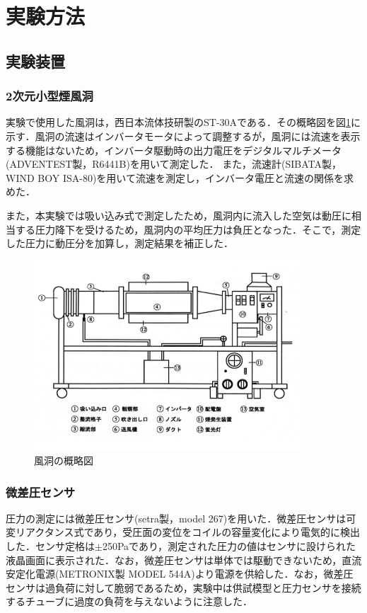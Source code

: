 \documentclass[a4paper,11pt,uplatex]{jsarticle}
\begin{document}
\section{実験方法}
\subsection{実験装置}
\subsubsection{2次元小型煙風洞}
  実験で使用した風洞は，西日本流体技研製のST-30Aである．その概略図を図\ref{風洞図}に示す．風洞の流速はインバータモータによって調整するが，風洞には流速を表示する機能はないため，インバータ駆動時の出力電圧をデジタルマルチメータ(ADVENTEST製，R6441B)を用いて測定した．
  また，流速計(SIBATA製，WIND BOY ISA-80)を用いて流速を測定し，インバータ電圧と流速の関係を求めた．
  \par
  また，本実験では吸い込み式で測定したため，風洞内に流入した空気は動圧に相当する圧力降下を受けるため，風洞内の平均圧力は負圧となった．そこで，測定した圧力に動圧分を加算し，測定結果を補正した．

  \begin{figure}[H]
    \begin{center}
      \includegraphics[width = 10cm]{pic/風洞図.png}
      \caption{風洞の概略図}
      \label{風洞図}
    \end{center}
  \end{figure}
\subsubsection{微差圧センサ}
圧力の測定には微差圧センサ(setra製，model 267)を用いた．微差圧センサは可変リアクタンス式であり，受圧面の変位をコイルの容量変化により電気的に検出した．センサ定格は$\pm$250Paであり，測定された圧力の値はセンサに設けられた液晶画面に表示された．なお，微差圧センサは単体では駆動できないため，直流安定化電源(METRONIX製 MODEL 544A)より電源を供給した．なお，微差圧センサは過負荷に対して脆弱であるため，実験中は供試模型と圧力センサを接続するチューブに過度の負荷を与えないように注意した．
\end{document}

